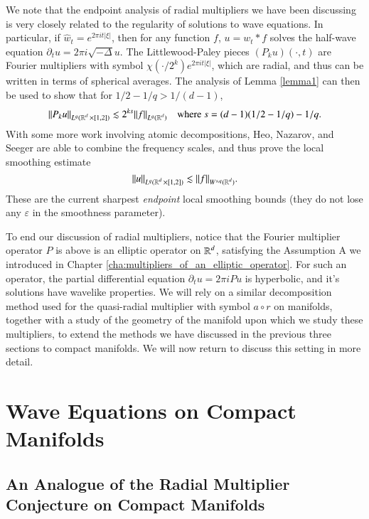 We note that the endpoint analysis of radial multipliers we have been discussing is very closely related to the regularity of solutions to wave equations. In particular, if $\widehat{w}_t = e^{2 \pi i t |\xi|}$, then for any function $f$, $u = w_t * f$ solves the half-wave equation $\partial_t u = 2 \pi i \sqrt{-\Delta} u$. The Littlewood-Paley pieces $(P_k u)(\cdot,t)$ are Fourier multipliers with symbol $\chi(\cdot / 2^k) e^{2 \pi i t |\xi|}$, which are radial, and thus can be written in terms of spherical averages. The analysis of Lemma \ref{lemma1} can then be used to show that for $1/2 - 1/q > 1/(d-1)$,
%
\begin{equation}
  \| P_k u \|_{L^q( \operatorname{\mathbb{R}}^d \times [1,2] )} \lesssim 2^{k s} \| f \|_{L^q(\operatorname{\mathbb{R}}^d)}\quad\text{where}\ s = (d-1)(1/2 - 1/q) - 1/q.
\end{equation}
%
With some more work involving atomic decompositions, Heo, Nazarov, and Seeger are able to combine the frequency scales, and thus prove the local smoothing estimate
%
\begin{equation}
  \| u \|_{L^q(\operatorname{\mathbb{R}}^d \times [1,2])} \lesssim \| f \|_{W^{s,q}(\operatorname{\mathbb{R}}^d)}.
\end{equation}
%
These are the current sharpest \emph{endpoint} local smoothing bounds (they do not lose any $\varepsilon$ in the smoothness parameter).

To end our discussion of radial multipliers, notice that the Fourier multiplier operator $P$ is above is an elliptic operator on $\operatorname{\mathbb{R}}^d$, satisfying the Assumption A we introduced in Chapter \ref{cha:multipliers_of_an_elliptic_operator}. For such an operator, the partial differential equation $\partial_t u = 2 \pi i P u$ is hyperbolic, and it's solutions have wavelike properties. We will rely on a similar decomposition method used for the quasi-radial multiplier with symbol $a \circ r$ on manifolds, together with a study of the geometry of the manifold upon which we study these multipliers, to extend the methods we have discussed in the previous three sections to compact manifolds. We will now return to discuss this setting in more detail.








\chapter{Wave Equations on Compact Manifolds} \label{chap:waveequation}

\section{An Analogue of the Radial Multiplier Conjecture on Compact Manifolds} \label{sec:AnAnalogueOf}

